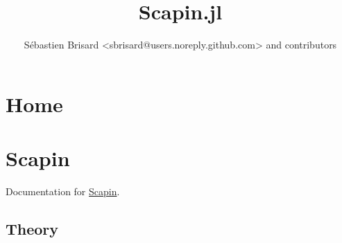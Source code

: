 \documentclass[oneside]{memoir}
\title{
    {\HUGE Scapin.jl}\\
    {\Large }
}
\author{Sébastien Brisard <sbrisard@users.noreply.github.com> and contributors}
\begin{document}
\frontmatter
\maketitle
\clearpage
\tableofcontents

\mainmatter



\part{Home}




\hypertarget{4654847035117066990}{}


\part{Scapin}



Documentation for \href{https://github.com/sbrisard/Scapin.jl}{Scapin}.



\hypertarget{14784546651712552159}{}


\chapter{Theory}
\end{document}
